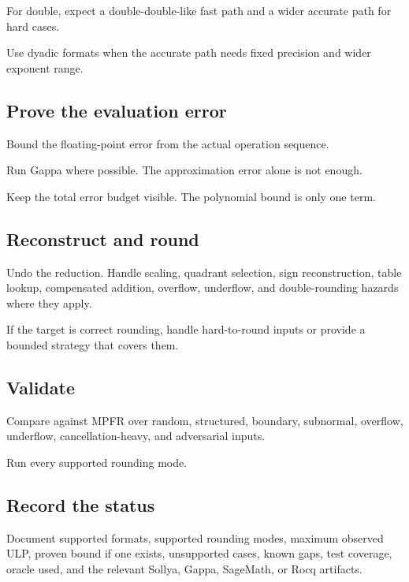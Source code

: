 \documentclass[manuscript, nonacm]{acmart}
\begin{document}
    For double, expect a double-double-like fast path and a wider accurate path
    for hard cases.

    Use dyadic formats when the accurate path needs fixed precision and wider
    exponent range.

    \subsection{Prove the evaluation error}

    Bound the floating-point error from the actual operation sequence.

    Run Gappa where possible. The approximation error alone is not enough.

    Keep the total error budget visible. The polynomial bound is only one term.

    \subsection{Reconstruct and round}

    Undo the reduction. Handle scaling, quadrant selection, sign reconstruction,
    table lookup, compensated addition, overflow, underflow, and double-rounding
    hazards where they apply.

    If the target is correct rounding, handle hard-to-round inputs or provide a
    bounded strategy that covers them.

    \subsection{Validate}

    Compare against MPFR over random, structured, boundary, subnormal, overflow,
    underflow, cancellation-heavy, and adversarial inputs.

    Run every supported rounding mode.

    \subsection{Record the status}

    Document supported formats, supported rounding modes, maximum observed ULP,
    proven bound if one exists, unsupported cases, known gaps, test coverage,
    oracle used, and the relevant Sollya, Gappa, SageMath, or Rocq artifacts.

\end{document}
